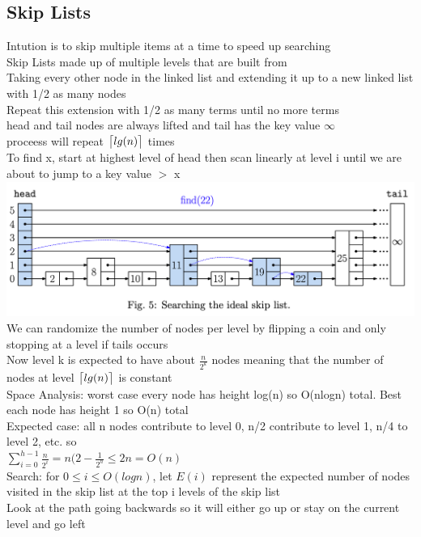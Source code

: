 \documentclass{article}
\DeclarePairedDelimiter{\ceil}{\lceil}{\rceil}
\begin{document}
  \subsection{Skip Lists}
  Intution is to skip multiple items at a time to speed up searching \\
  Skip Lists made up of multiple levels that are built from \\
  \indent Taking every other node in the linked list and extending it up to a new linked list with 1/2 as many nodes \\
  \indent Repeat this extension with 1/2 as many terms until no more terms \\
  \indent head and tail nodes are always lifted and tail has the key value $\infty$ \\
  \indent proceess will repeat $\ceil[\big]{lg(n)}$ times \\ 
  To find x, start at highest level of head then scan linearly at level i until we are about to jump to a key value $>$ x\\
  \includegraphics[width=\textwidth]{SkipListSearch}
  We can randomize the number of nodes per level by flipping a coin and only stopping at a level if tails occurs\\
  \indent Now level k is expected to have about $\frac{n}{2^{k}}$ nodes meaning that the number of nodes at level $\ceil[\big]{lg(n)}$ is constant\\
  Space Analysis: worst case every node has height log(n) so O(nlogn) total. Best each node has height 1 so O(n) total\\
  \indent Expected case: all n nodes contribute to level 0, n/2 contribute to level 1, n/4 to level 2, etc. so\\
  \indent \indent $\sum_{i=0}^{h-1}\frac{n}{2^{i}} = n(2 - \frac{1}{2^{h}} \leq 2n = O(n)$\\
  Search: for $0 \leq i \leq O(logn)$, let $E(i)$ represent the expected number of nodes visited in the skip list at the top i levels of the skip list\\
  Look at the path going backwards so it will either go up or stay on the current level and go left \\
\end{document}
